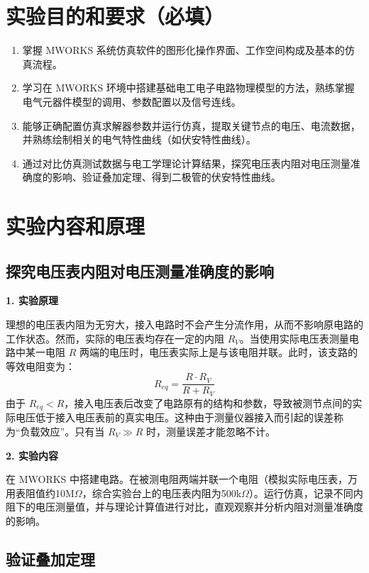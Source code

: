 \documentclass[10.5pt]{config}
\date{2026年3月26日}
\begin{document}
\makeheader %

\section{实验目的和要求（必填）}

\begin{enumerate}[label=\arabic*., leftmargin=2em]
    \item 掌握 MWORKS 系统仿真软件的图形化操作界面、工作空间构成及基本的仿真流程。
    \item 学习在 MWORKS 环境中搭建基础电工电子电路物理模型的方法，熟练掌握电气元器件模型的调用、参数配置以及信号连线。
    \item 能够正确配置仿真求解器参数并运行仿真，提取关键节点的电压、电流数据，并熟练绘制相关的电气特性曲线（如伏安特性曲线）。
    \item 通过对比仿真测试数据与电工学理论计算结果，探究电压表内阻对电压测量准确度的影响、验证叠加定理、得到二极管的伏安特性曲线。
\end{enumerate}

\section{实验内容和原理}


\subsection{探究电压表内阻对电压测量准确度的影响}

\textbf{1. 实验原理}

理想的电压表内阻为无穷大，接入电路时不会产生分流作用，从而不影响原电路的工作状态。然而，实际的电压表均存在一定的内阻 $R_V$。当使用实际电压表测量电路中某一电阻 $R$ 两端的电压时，电压表实际上是与该电阻并联。此时，该支路的等效电阻变为：
$$R_{eq} = \frac{R \cdot R_V}{R + R_V}$$
由于 $R_{eq} < R$，接入电压表后改变了电路原有的结构和参数，导致被测节点间的实际电压低于接入电压表前的真实电压。这种由于测量仪器接入而引起的误差称为“负载效应”。只有当 $R_V \gg R$ 时，测量误差才能忽略不计。

\textbf{2. 实验内容}

在 MWORKS 中搭建电路。在被测电阻两端并联一个电阻（模拟实际电压表，万用表阻值约10M$\Omega$，综合实验台上的电压表内阻为500k$\Omega$）。运行仿真，记录不同内阻下的电压测量值，并与理论计算值进行对比，直观观察并分析内阻对测量准确度的影响。

\subsection{验证叠加定理}
\end{document}

